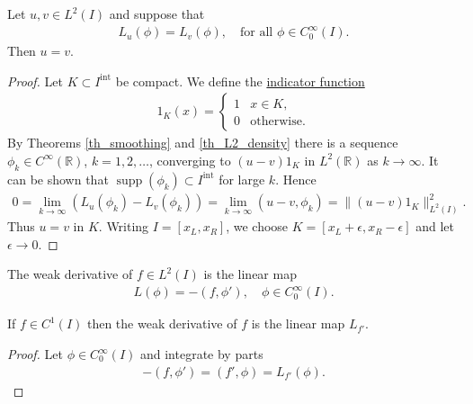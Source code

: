 \documentclass[12pt,oneside]{amsart}
\def\R{\mathbb R}
\DeclareMathOperator{\supp}{supp}
\def\inter{\mathrm{int}}
\begin{document}
\begin{lemma}
Let $u, v \in L^2(I)$ and suppose that 
    \begin{align*}
L_u(\phi) = L_v(\phi), \quad \text{for all $\phi \in C_0^\infty(I)$}.
    \end{align*}
Then $u = v$.
\end{lemma}
\begin{proof}
Let $K \subset I^\inter$ be compact.
We define the \href{https://en.wikipedia.org/wiki/Indicator_function}{indicator function} 
    \begin{align*}
1_K(x) = 
\begin{cases}
1 & x \in K,
\\ 
0 & \text{otherwise}.
\end{cases}
    \end{align*}
By Theorems \ref{th_smoothing} and \ref{th_L2_density} there is a sequence $\phi_k \in C^\infty(\R)$, $k=1,2,\dots$, converging to $(u - v)1_K$ in $L^2(\R)$ as $k \to \infty$. It can be shown that $\supp(\phi_k) \subset I^\inter$ for large $k$. Hence  
    \begin{align*}
0 = \lim_{k \to \infty} (L_u(\phi_k) - L_v(\phi_k)) = \lim_{k \to \infty} (u - v, \phi_k) = \|(u - v) 1_K\|_{L^2(I)}^2.
    \end{align*} 
Thus $u = v$ in $K$. 
Writing $I = [x_L, x_R]$, we choose $K = [x_L + \epsilon, x_R -\epsilon]$ and let $\epsilon \to 0$. 
\end{proof}

\begin{definition}
The weak derivative of $f \in L^2(I)$ is the linear map
    \begin{align*}
L(\phi) = -(f, \phi'), \quad \phi \in C_0^\infty(I).
    \end{align*}
\end{definition}

\begin{lemma}\label{lem_weak_classic}
If $f \in C^1(I)$ then the weak derivative of $f$ is the linear map $L_{f'}$.
\end{lemma}
\begin{proof}
Let $\phi \in C_0^\infty(I)$ and integrate by parts
    \begin{align*}
-(f, \phi') = (f', \phi) = L_{f'}(\phi).
    \end{align*}
\end{proof}
\end{document}
